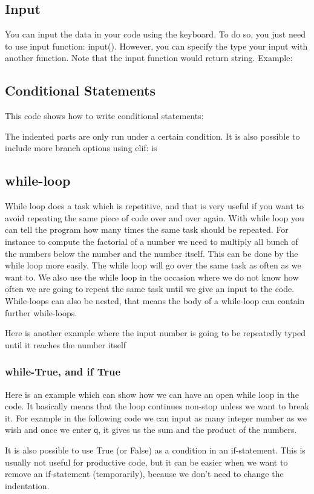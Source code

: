 \documentclass[10pt,a4paper]{article}
\begin{document}
\subsection{Input}
\label{subsec:Input}
You can input the data in your code using the keyboard. To do so, you just need to use input function: input(). However, you can specify the type your input with another function. Note that the input function would return string.
Example:



\subsection{Conditional Statements}
This code shows how to write conditional statements:

The indented parts are only run under a certain condition.
It is also possible to include more branch options using elif:
is


\subsection{while-loop}
While loop does a task which is repetitive, and that is very useful if you want to avoid repeating the same piece  of code over and over again.  With while loop you can tell the program how many times the same task should be repeated. 
For instance to compute the factorial of a number we need to multiply all bunch of the numbers below the number and the number itself. This can be done by the while loop more easily. The while loop will go over the same task as often as we want to. We also use the while loop in the occasion where we do not know how often we are going to repeat the same task until we give an input to the code. While-loops can also be
nested, that means the body of a while-loop can contain further while-loops.

Here is another example where the input number is going to be repeatedly typed until it reaches the number itself

\subsubsection{while-True, and if True}
Here is an example which can show how we can have an open while loop in the code. It basically means that the loop continues non-stop unless we want to break it. For example in the following code we can input as many integer number as we wish and once we enter \texttt{q}, it gives us the sum and the product of the numbers.

It is also possible to use True (or False) as a condition in an if-statement. This is usually not useful for productive code, but it can be easier when we want to remove an if-statement (temporarily), because we don't need to change the indentation.
\end{document}
